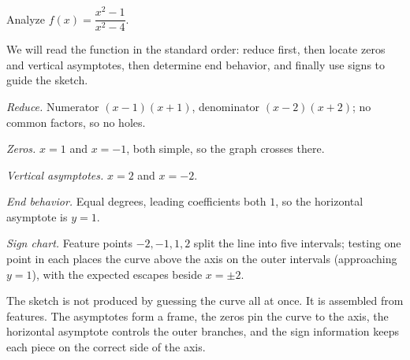 \documentclass[12pt]{book}
\begin{document}
\begin{example}
Analyze $f(x)=\dfrac{x^2-1}{x^2-4}$.

We will read the function in the standard order: reduce first, then locate zeros and
vertical asymptotes, then determine end behavior, and finally use signs to guide the
sketch.

\emph{Reduce.} Numerator $(x-1)(x+1)$, denominator $(x-2)(x+2)$; no common factors,
so no holes.

\emph{Zeros.} $x=1$ and $x=-1$, both simple, so the graph crosses there.

\emph{Vertical asymptotes.} $x=2$ and $x=-2$.

\emph{End behavior.} Equal degrees, leading coefficients both $1$, so the horizontal
asymptote is $y=1$.

\emph{Sign chart.} Feature points $-2,-1,1,2$ split the line into five intervals;
testing one point in each places the curve above the axis on the outer intervals
(approaching $y=1$), with the expected escapes beside $x=\pm2$.
\end{example}

The sketch is not produced by guessing the curve all at once. It is assembled from
features. The asymptotes form a frame, the zeros pin the curve to the axis, the
horizontal asymptote controls the outer branches, and the sign information keeps each
piece on the correct side of the axis.

\begin{center}
\end{center}
\end{document}
